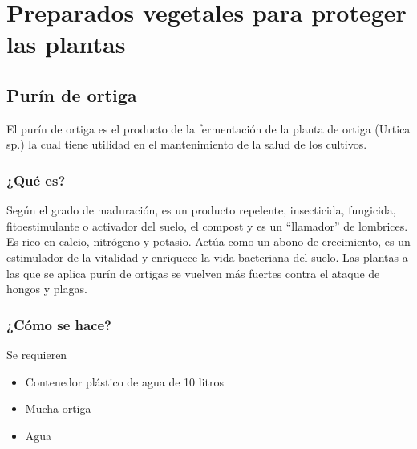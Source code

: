 \documentclass[../main.tex]{subfiles}
\begin{document}
\section{Preparados vegetales para proteger las plantas}\label{appendixC}

\subsection{Purín de ortiga}

El purín de ortiga es el producto de la fermentación de la planta de ortiga (Urtica sp.) la cual tiene utilidad en el mantenimiento de la salud de los cultivos. \\

\subsubsection{¿Qué es?}


Según el grado de maduración, es un producto repelente, insecticida, fungicida, fitoestimulante o activador del suelo, el compost y es un “llamador” de lombrices. \\

Es rico en calcio, nitrógeno y potasio. Actúa como un abono de crecimiento, es un estimulador de la vitalidad y enriquece la vida bacteriana del suelo. Las plantas a las que se aplica purín de ortigas se vuelven más fuertes contra el ataque de hongos y plagas.  \\

\subsubsection{¿Cómo se hace?}

Se requieren \\
\begin{itemize}
    \item Contenedor plástico de agua de 10 litros
    \item Mucha ortiga
    \item Agua
\end{itemize}

\hfill\\
\end{document}
